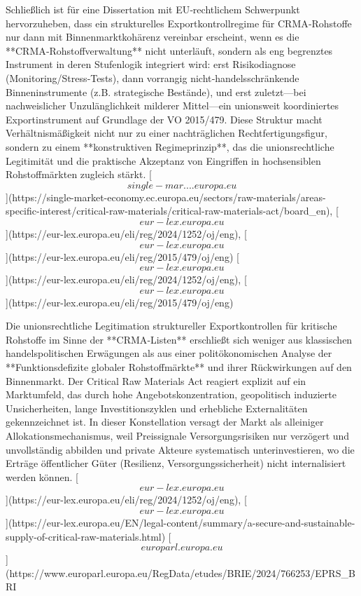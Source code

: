 \documentclass[12pt,a4paper,oneside]{book} %
\begin{document}
Schließlich ist für eine Dissertation mit EU‑rechtlichem Schwerpunkt hervorzuheben, dass ein strukturelles Exportkontrollregime für CRMA‑Rohstoffe nur dann mit Binnenmarktkohärenz vereinbar erscheint, wenn es die **CRMA‑Rohstoffverwaltung** nicht unterläuft, sondern als eng begrenztes Instrument in deren Stufenlogik integriert wird: erst Risikodiagnose (Monitoring/Stress‑Tests), dann vorrangig nicht‑handelsschränkende Binneninstrumente (z.B. strategische Bestände), und erst zuletzt—bei nachweislicher Unzulänglichkeit milderer Mittel—ein unionsweit koordiniertes Exportinstrument auf Grundlage der VO 2015/479.  Diese Struktur macht Verhältnismäßigkeit nicht nur zu einer nachträglichen Rechtfertigungsfigur, sondern zu einem **konstruktiven Regimeprinzip**, das die unionsrechtliche Legitimität und die praktische Akzeptanz von Eingriffen in hochsensiblen Rohstoffmärkten zugleich stärkt. [\[single-mar....europa.eu\]](https://single-market-economy.ec.europa.eu/sectors/raw-materials/areas-specific-interest/critical-raw-materials/critical-raw-materials-act/board_en), [\[eur-lex.europa.eu\]](https://eur-lex.europa.eu/eli/reg/2024/1252/oj/eng), [\[eur-lex.europa.eu\]](https://eur-lex.europa.eu/eli/reg/2015/479/oj/eng) [\[eur-lex.europa.eu\]](https://eur-lex.europa.eu/eli/reg/2024/1252/oj/eng), [\[eur-lex.europa.eu\]](https://eur-lex.europa.eu/eli/reg/2015/479/oj/eng)



Die unionsrechtliche Legitimation struktureller Exportkontrollen für kritische Rohstoffe im Sinne der **CRMA‑Listen** erschließt sich weniger aus klassischen handelspolitischen Erwägungen als aus einer politökonomischen Analyse der **Funktionsdefizite globaler Rohstoffmärkte** und ihrer Rückwirkungen auf den Binnenmarkt. Der Critical Raw Materials Act reagiert explizit auf ein Marktumfeld, das durch hohe Angebotskonzentration, geopolitisch induzierte Unsicherheiten, lange Investitionszyklen und erhebliche Externalitäten gekennzeichnet ist.  In dieser Konstellation versagt der Markt als alleiniger Allokationsmechanismus, weil Preissignale Versorgungsrisiken nur verzögert und unvollständig abbilden und private Akteure systematisch unterinvestieren, wo die Erträge öffentlicher Güter (Resilienz, Versorgungssicherheit) nicht internalisiert werden können. [\[eur-lex.europa.eu\]](https://eur-lex.europa.eu/eli/reg/2024/1252/oj/eng), [\[eur-lex.europa.eu\]](https://eur-lex.europa.eu/EN/legal-content/summary/a-secure-and-sustainable-supply-of-critical-raw-materials.html) [\[europarl.europa.eu\]](https://www.europarl.europa.eu/RegData/etudes/BRIE/2024/766253/EPRS_BRI%
\end{document}
